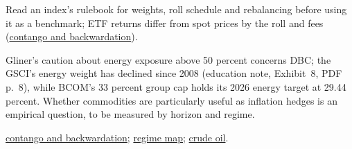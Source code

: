 \begin{qfdefinition}
 Read an index's rulebook for weights, roll schedule and rebalancing before using it as a benchmark; ETF returns differ from spot prices by the roll and fees (\hyperref[def:contango-backwardation-stocks]{contango and backwardation}).

 Gliner's caution about energy exposure above 50 percent concerns DBC; the GSCI's energy weight has declined since 2008 (education note, Exhibit~8, PDF p.~8), while BCOM's 33 percent group cap holds its 2026 energy target at 29.44 percent. Whether commodities are particularly useful as inflation hedges is an empirical question, to be measured by horizon and regime.

 \hyperref[def:contango-backwardation-stocks]{contango and backwardation}; \hyperref[def:macro-regime-asset-map]{regime map}; \hyperref[def:crude-oil-markets]{crude oil}.


\end{qfdefinition}
